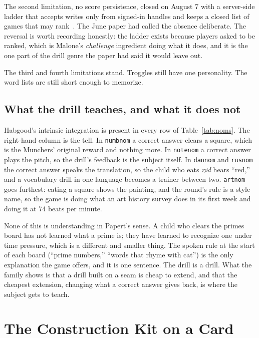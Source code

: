 \documentclass[10pt,letterpaper,twocolumn]{article}
\newcommand{\code}[1]{\texttt{#1}}
\newcommand{\term}[1]{``#1''}
\begin{document}
The second limitation, no score persistence, closed on August 7 with a server-side ladder that accepts writes only from signed-in handles and keeps a closed list of games that may rank~\citep{acrepo2026}. The June paper had called the absence deliberate. The reversal is worth recording honestly: the ladder exists because players asked to be ranked, which is Malone's \emph{challenge} ingredient doing what it does, and it is the one part of the drill genre the paper had said it would leave out.

The third and fourth limitations stand. Troggles still have one personality. The word lists are still short enough to memorize.

\subsection{What the drill teaches, and what it does not}

Habgood's intrinsic integration is present in every row of Table~\ref{tab:noms}. The right-hand column is the tell. In \code{numbnom} a correct answer clears a square, which is the Munchers' original reward and nothing more. In \code{notenom} a correct answer plays the pitch, so the drill's feedback is the subject itself. In \code{dannom} and \code{rusnom} the correct answer speaks the translation, so the child who eats \emph{r{\o}d} hears \term{red,} and a vocabulary drill in one language becomes a trainer between two. \code{artnom} goes furthest: eating a square shows the painting, and the round's rule is a style name, so the game is doing what an art history survey does in its first week and doing it at 74 beats per minute.

None of this is understanding in Papert's sense. A child who clears the primes board has not learned what a prime is; they have learned to recognize one under time pressure, which is a different and smaller thing. The spoken rule at the start of each board (\term{prime numbers,} \term{words that rhyme with cat}) is the only explanation the game offers, and it is one sentence. The drill is a drill. What the family shows is that a drill built on a seam is cheap to extend, and that the cheapest extension, changing what a correct answer gives back, is where the subject gets to teach.

\section{The Construction Kit on a Card}
\label{sec:cards}
\end{document}
